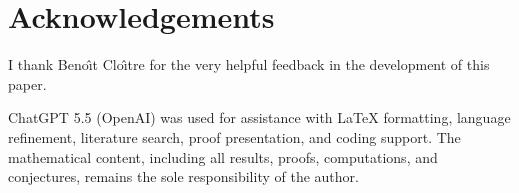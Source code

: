 \documentclass[11pt]{article}
\theoremstyle{definition}
\theoremstyle{remark}
\begin{document}
\section*{Acknowledgements}

I thank Beno\^{\i}t Clo\^{\i}tre for the very helpful feedback in the development of this paper.

ChatGPT 5.5 (OpenAI) was used for assistance with LaTeX formatting,
language refinement, literature search, proof presentation, and coding support.
The mathematical content, including all results, proofs, computations, and
conjectures, remains the sole responsibility of the author.

\nocite{*}
\FloatBarrier


\end{document}
